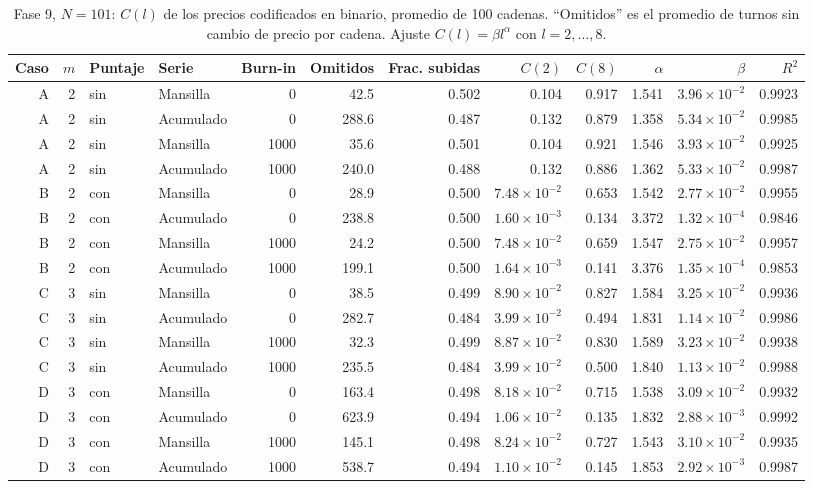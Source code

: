 \documentclass[11pt,letterpaper]{article}
\begin{document}
\begin{table}[H]
\centering
\footnotesize
\setlength{\tabcolsep}{3.5pt}
\caption{Fase 9, $N=101$: $C(l)$ de los precios codificados en binario, promedio de 100 cadenas. ``Omitidos'' es el promedio de turnos sin cambio de precio por cadena. Ajuste $C(l)=\beta l^\alpha$ con $l=2,\dots,8$.}\label{tab:f9ck}
\begin{adjustbox}{max width=\textwidth}
\begin{tabular}{rrllrrrrrrrr}
\toprule
Caso & $m$ & Puntaje & Serie & Burn-in & Omitidos & Frac. subidas & $C(2)$ & $C(8)$ & $\alpha$ & $\beta$ & $R^2$ \\
\midrule
A & 2 & sin & Mansilla & 0 & 42.5 & 0.502 & 0.104 & 0.917 & 1.541 & $3.96\times10^{-2}$ & 0.9923 \\
A & 2 & sin & Acumulado & 0 & 288.6 & 0.487 & 0.132 & 0.879 & 1.358 & $5.34\times10^{-2}$ & 0.9985 \\
A & 2 & sin & Mansilla & 1000 & 35.6 & 0.501 & 0.104 & 0.921 & 1.546 & $3.93\times10^{-2}$ & 0.9925 \\
A & 2 & sin & Acumulado & 1000 & 240.0 & 0.488 & 0.132 & 0.886 & 1.362 & $5.33\times10^{-2}$ & 0.9987 \\
B & 2 & con & Mansilla & 0 & 28.9 & 0.500 & $7.48\times10^{-2}$ & 0.653 & 1.542 & $2.77\times10^{-2}$ & 0.9955 \\
B & 2 & con & Acumulado & 0 & 238.8 & 0.500 & $1.60\times10^{-3}$ & 0.134 & 3.372 & $1.32\times10^{-4}$ & 0.9846 \\
B & 2 & con & Mansilla & 1000 & 24.2 & 0.500 & $7.48\times10^{-2}$ & 0.659 & 1.547 & $2.75\times10^{-2}$ & 0.9957 \\
B & 2 & con & Acumulado & 1000 & 199.1 & 0.500 & $1.64\times10^{-3}$ & 0.141 & 3.376 & $1.35\times10^{-4}$ & 0.9853 \\
C & 3 & sin & Mansilla & 0 & 38.5 & 0.499 & $8.90\times10^{-2}$ & 0.827 & 1.584 & $3.25\times10^{-2}$ & 0.9936 \\
C & 3 & sin & Acumulado & 0 & 282.7 & 0.484 & $3.99\times10^{-2}$ & 0.494 & 1.831 & $1.14\times10^{-2}$ & 0.9986 \\
C & 3 & sin & Mansilla & 1000 & 32.3 & 0.499 & $8.87\times10^{-2}$ & 0.830 & 1.589 & $3.23\times10^{-2}$ & 0.9938 \\
C & 3 & sin & Acumulado & 1000 & 235.5 & 0.484 & $3.99\times10^{-2}$ & 0.500 & 1.840 & $1.13\times10^{-2}$ & 0.9988 \\
D & 3 & con & Mansilla & 0 & 163.4 & 0.498 & $8.18\times10^{-2}$ & 0.715 & 1.538 & $3.09\times10^{-2}$ & 0.9932 \\
D & 3 & con & Acumulado & 0 & 623.9 & 0.494 & $1.06\times10^{-2}$ & 0.135 & 1.832 & $2.88\times10^{-3}$ & 0.9992 \\
D & 3 & con & Mansilla & 1000 & 145.1 & 0.498 & $8.24\times10^{-2}$ & 0.727 & 1.543 & $3.10\times10^{-2}$ & 0.9935 \\
D & 3 & con & Acumulado & 1000 & 538.7 & 0.494 & $1.10\times10^{-2}$ & 0.145 & 1.853 & $2.92\times10^{-3}$ & 0.9987 \\
\bottomrule
\end{tabular}
\end{adjustbox}
\end{table}
\end{document}
